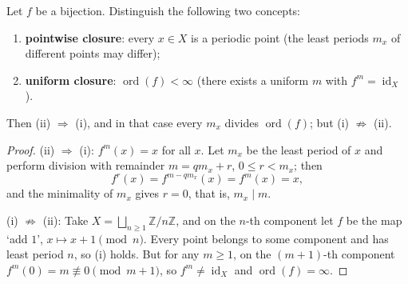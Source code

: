 \begin{lemma}\label{lem:pointwise_vs_uniform}
Let $f$ be a bijection. Distinguish the following two concepts:
\begin{enumerate}[label=(\roman*)]
    \item \textbf{pointwise closure}: every $x\in X$ is a periodic point (the least periods $m_x$ of different points may differ);
    \item \textbf{uniform closure}: $\operatorname{ord}(f)<\infty$ (there exists a uniform $m$ with $f^m=\operatorname{id}_X$).
\end{enumerate}
Then (ii) $\Rightarrow$ (i), and in that case every $m_x$ divides $\operatorname{ord}(f)$; but (i) $\nRightarrow$ (ii).
\end{lemma}

\begin{proof}
(ii) $\Rightarrow$ (i): $f^m(x)=x$ for all $x$. Let $m_x$ be the least period of $x$ and perform division with remainder $m=qm_x+r$, $0\le r<m_x$; then
\[
f^r(x)=f^{m-qm_x}(x)=f^m(x)=x,
\]
and the minimality of $m_x$ gives $r=0$, that is, $m_x\mid m$.

(i) $\nRightarrow$ (ii): Take $X=\bigsqcup_{n\ge 1}\mathbb{Z}/n\mathbb{Z}$, and on the $n$-th component let $f$ be the map `add $1$', $x\mapsto x+1\pmod n$. Every point belongs to some component and has least period $n$, so (i) holds. But for any $m\ge 1$, on the $(m+1)$-th component $f^m(0)=m\not\equiv 0\pmod{m+1}$, so $f^m\neq\operatorname{id}_X$ and $\operatorname{ord}(f)=\infty$.
\end{proof}


